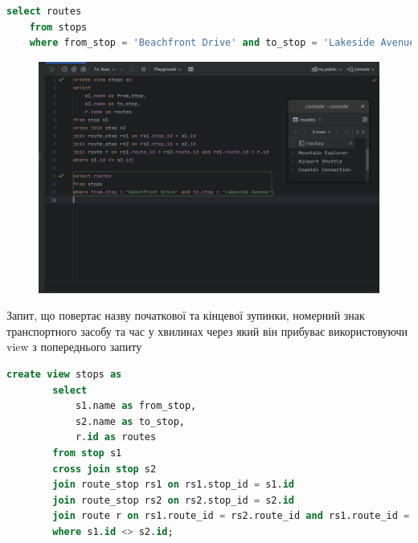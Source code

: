 \documentclass[14pt]{extreport}
\begin{document}
\begin{normalsize}
\begin{lstlisting}[language=sql]
	select routes
	from stops
	where from_stop = 'Beachfront Drive' and to_stop = 'Lakeside Avenue';
	\end{lstlisting}
	\fi
	\begin{figure}[H]
		\centering
		\includegraphics[scale=0.5]{3}
		\caption{}
	\end{figure}
	
	Запит, що повертає назву початкової та кінцевої зупинки, номерний знак транспортного засобу та час у хвилинах через який він прибуває використовуючи view з попереднього запиту
	
	\iffalse
	\begin{lstlisting}[language=sql]
		create view stops as
		select
			s1.name as from_stop,
			s2.name as to_stop,
			r.id as routes
		from stop s1
		cross join stop s2
		join route_stop rs1 on rs1.stop_id = s1.id
		join route_stop rs2 on rs2.stop_id = s2.id
		join route r on rs1.route_id = rs2.route_id and rs1.route_id = r.id
		where s1.id <> s2.id;
		

\end{lstlisting}
\end{normalsize}
\end{document}
